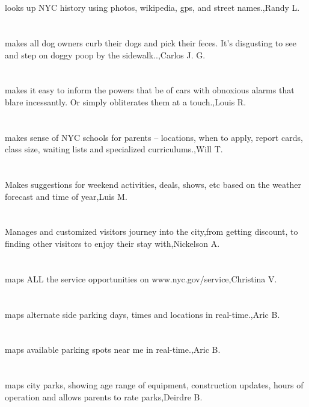 \section{}looks up NYC history using photos, wikipedia, gps, and street names.,Randy L.	
\section{}makes all dog owners curb their dogs and pick their feces. It's disgusting to see and step on doggy poop by the sidewalk..,Carlos J.  G.	
\section{}makes it easy to inform the powers that be of cars with obnoxious alarms that blare incessantly. Or simply obliterates them at a touch.,Louis R.	
\section{}makes sense of NYC schools for parents -- locations, when to apply, report cards, class size, waiting lists and specialized curriculums.,Will T.	
\section{}Makes suggestions for weekend activities, deals, shows, etc based on the weather forecast and time of year,Luis M.	
\section{}Manages and customized visitors journey into the city,from getting discount, to finding other visitors to enjoy their stay with,Nickelson A.	
\section{}maps ALL the service opportunities on www.nyc.gov/service,Christina  V.	
\section{}maps alternate side parking days, times and locations in real-time.,Aric B.	
\section{}maps available parking spots near me in real-time.,Aric B.	
\section{}maps city parks, showing age range of equipment, construction updates, hours of operation and allows parents to rate parks,Deirdre B.	
